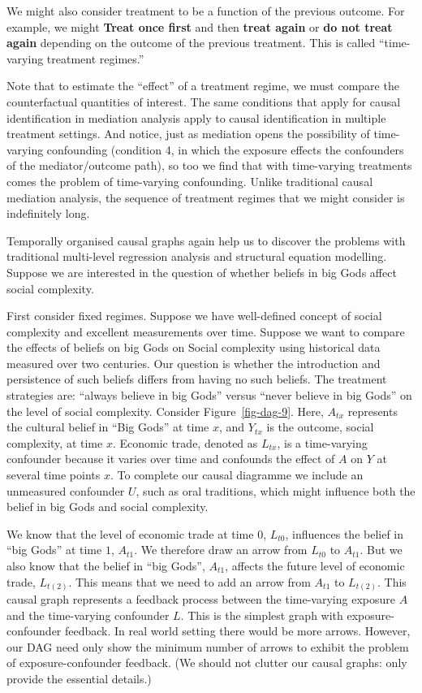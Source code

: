 \documentclass[
  singlecolumn]{report}
\begin{document}
We might also consider treatment to be a function of the previous
outcome. For example, we might \textbf{Treat once first} and then
\textbf{treat again} or \textbf{do not treat again} depending on the
outcome of the previous treatment. This is called ``time-varying
treatment regimes.''

Note that to estimate the ``effect'' of a treatment regime, we must
compare the counterfactual quantities of interest. The same conditions
that apply for causal identification in mediation analysis apply to
causal identification in multiple treatment settings. And notice, just
as mediation opens the possibility of time-varying confounding
(condition 4, in which the exposure effects the confounders of the
mediator/outcome path), so too we find that with time-varying treatments
comes the problem of time-varying confounding. Unlike traditional causal
mediation analysis, the sequence of treatment regimes that we might
consider is indefinitely long.

Temporally organised causal graphs again help us to discover the
problems with traditional multi-level regression analysis and structural
equation modelling. Suppose we are interested in the question of whether
beliefs in big Gods affect social complexity.

First consider fixed regimes. Suppose we have well-defined concept of
social complexity and excellent measurements over time. Suppose we want
to compare the effects of beliefs on big Gods on Social complexity using
historical data measured over two centuries. Our question is whether the
introduction and persistence of such beliefs differs from having no such
beliefs. The treatment strategies are: ``always believe in big Gods''
versus ``never believe in big Gods'' on the level of social complexity.
Consider Figure~\ref{fig-dag-9}. Here, \(A_{tx}\) represents the
cultural belief in ``Big Gods'' at time \(x\), and \(Y_{tx}\) is the
outcome, social complexity, at time \(x\). Economic trade, denoted as
\(L_{tx}\), is a time-varying confounder because it varies over time and
confounds the effect of \(A\) on \(Y\) at several time points \(x\). To
complete our causal diagramme we include an unmeasured confounder \(U\),
such as oral traditions, which might influence both the belief in big
Gods and social complexity.

We know that the level of economic trade at time \(0\), \(L_{t0}\),
influences the belief in ``big Gods'' at time \(1\), \(A_{t1}\). We
therefore draw an arrow from \(L_{t0}\) to \(A_{t1}\). But we also know
that the belief in ``big Gods'', \(A_{t1}\), affects the future level of
economic trade, \(L_{t(2)}\). This means that we need to add an arrow
from \(A_{t1}\) to \(L_{t(2)}\). This causal graph represents a feedback
process between the time-varying exposure \(A\) and the time-varying
confounder \(L\). This is the simplest graph with exposure-confounder
feedback. In real world setting there would be more arrows. However, our
DAG need only show the minimum number of arrows to exhibit the problem
of exposure-confounder feedback. (We should not clutter our causal
graphs: only provide the essential details.)
\end{document}
